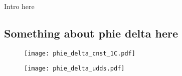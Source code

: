 
Intro here

\subsection{Something about phie delta here}

\begin{figure}[!htbp]
    \centering
    \texttt{[image: phie\_delta\_cnst\_1C.pdf]}
    \caption{}
    \label{}
\end{figure}

\begin{figure}[!htbp]
    \centering
    \texttt{[image: phie\_delta\_udds.pdf]}
    \caption{}
    \label{}
\end{figure}
